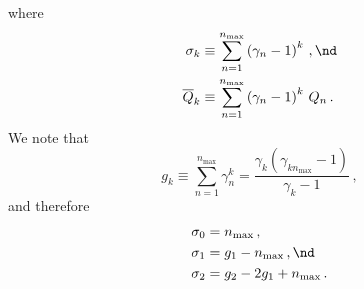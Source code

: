 where
 \begin{align}
\sigma_k &\equiv \sum_{n = 1}^{n_\text{max}} \left(\gamma_n - 1\right)^k\, , \nd \\
\overline{Q}_k &\equiv \sum_{n = 1}^{n_\text{max}} \left(\gamma_n - 1\right)^k\, Q_n\, .
 \end{align}
We note that
\begin{equation}
  g_k \equiv \sum_{n = 1}^{n_\text{max}} \gamma_n^k = \frac{\gamma_k \left(\gamma_{k n_\text{max}} - 1\right)}{\gamma_k - 1}\, ,
\end{equation}
and therefore
\begin{subequations}
  \begin{align}
    \sigma_0 &= n_\text{max}\, ,\\
    \sigma_1 &= g_1 - n_\text{max}\, , \nd \\
    \sigma_2 &= g_2 - 2 g_1 + n_\text{max}\, .
  \end{align}
\end{subequations}

